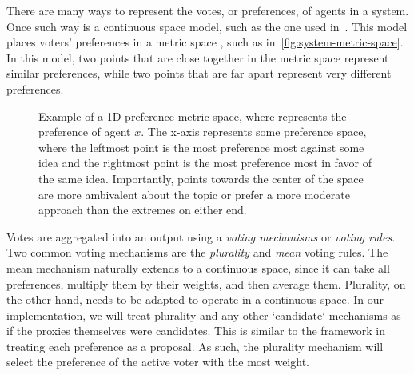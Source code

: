 
There are many ways to represent the votes, or preferences, of agents in a system.
Once such way is a continuous space model, such as the one used in~\cite{Cohensius2017}.
This model places voters' preferences in a metric space \systemspace, such as
in~\autoref{fig:system-metric-space}.
In this model, two points that are close together in the metric space represent
similar preferences, while two points that are far apart represent very different
preferences.

\begin{figure}[htbp]
    \centering
    
    \caption{
        Example of a 1D preference metric space, where  represents the
        preference of agent $x$.
        The x-axis represents some preference space, where the leftmost point is
        the most preference most against some idea and the rightmost point is the most
        preference most in favor of the same idea.
        Importantly, points towards the center of the space are more ambivalent about
        the topic or prefer a more moderate approach than the extremes on either end.
    }
    \label{fig:system-metric-space}
\end{figure}

Votes are aggregated into an output using a \textit{voting mechanisms} or
\textit{voting rules}.
Two common voting mechanisms are the \textit{plurality} and \textit{mean} voting rules.
The mean mechanism naturally extends to a continuous space, since it can take all
preferences, multiply them by their weights, and then average them.
Plurality, on the other hand, needs to be adapted to operate in a continuous space.
In our implementation, we will treat plurality and any other `candidate` mechanisms
as if the proxies themselves were candidates.
This is similar to the framework in~\cite{Bulteau2021} treating each preference as a
proposal.
As such, the plurality mechanism will select the preference of the active voter with
the most weight.

